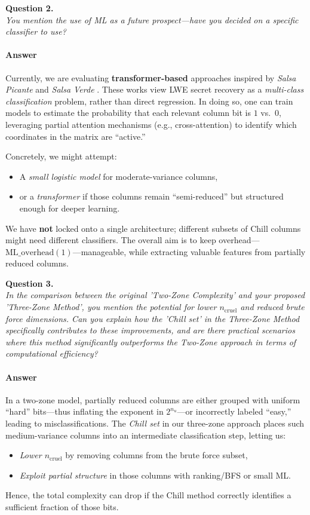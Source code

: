 \documentclass[12pt]{article}
\begin{document}
\vspace{0.6em}
\noindent
\textbf{Question 2.}\\
\emph{You mention the use of ML as a future prospect---have you decided on a specific classifier to use?}

\paragraph{Answer}
Currently, we are evaluating \textbf{transformer-based} approaches inspired by \textit{Salsa Picante} \cite{Picante2023} and \textit{Salsa Verde} \cite{Verde2023}. These works view LWE secret recovery as a \emph{multi-class classification} problem, rather than direct regression. In doing so, one can train models to estimate the probability that each relevant column bit is $1$ vs.\ $0$, leveraging partial attention mechanisms (e.g., cross-attention) to identify which coordinates in the matrix are “active.” 

Concretely, we might attempt:
\begin{itemize}
    \item A \textit{small logistic model} for moderate-variance columns, 
    \item or a \textit{transformer} if those columns remain “semi-reduced” but structured enough for deeper learning.
\end{itemize}
We have \textbf{not} locked onto a single architecture; different subsets of Chill columns might need different classifiers. The overall aim is to keep overhead---\(\mathrm{ML\_overhead}(1)\)---manageable, while extracting valuable features from partially reduced columns.

\vspace{0.6em}
\noindent
\textbf{Question 3.}\\
\emph{In the comparison between the original 'Two-Zone Complexity' and your proposed 'Three-Zone Method', you mention the potential for lower $n_{\mathrm{cruel}}$ and reduced brute force dimensions. Can you explain how the 'Chill set' in the Three-Zone Method specifically contributes to these improvements, and are there practical scenarios where this method significantly outperforms the Two-Zone approach in terms of computational efficiency?}

\paragraph{Answer}
In a two-zone model, partially reduced columns are either grouped with uniform “hard” bits---thus inflating the exponent in $2^{n_u}$---or incorrectly labeled “easy,” leading to misclassifications. The \emph{Chill set} in our three-zone approach places such medium-variance columns into an intermediate classification step, letting us:
\begin{itemize}
    \item \emph{Lower $n_{\mathrm{cruel}}$} by removing columns from the brute force subset,
    \item \emph{Exploit partial structure} in those columns with ranking/BFS or small ML. 
\end{itemize}
Hence, the total complexity can drop if the Chill method correctly identifies a sufficient fraction of those bits. 
\end{document}
